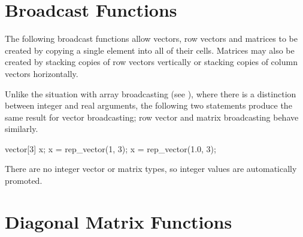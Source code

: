 \section{Broadcast Functions}\label{matrix-broadcast.section}

The following broadcast functions allow vectors, row vectors and
matrices to be created by copying a single element into all of their
cells.  Matrices may also be created by stacking copies of row vectors
vertically or stacking copies of column vectors horizontally.

\begin{description}
%
%
%
%
%
%
\end{description}
%

Unlike the situation with array broadcasting (see ), where there is a
distinction between integer and real arguments, the following two
statements produce the same result for vector broadcasting;  row vector
and matrix broadcasting behave similarly.
%
\begin{stancode}
vector[3] x;
x = rep_vector(1, 3);
x = rep_vector(1.0, 3);  
\end{stancode}
%
There are no integer vector or matrix types, so integer values are
automatically promoted.


\section{Diagonal Matrix Functions}

\begin{description}
%
%
%
\end{description}



